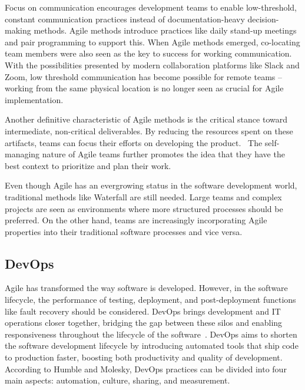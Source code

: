 Focus on communication encourages development teams to enable low-threshold, constant communication practices instead of documentation-heavy decision-making methods. Agile methods introduce practices like daily stand-up meetings and pair programming to support this. When Agile methods emerged, co-locating team members were also seen as the key to success for working communication. With the possibilities presented by modern collaboration platforms like Slack and Zoom, low threshold communication has become possible for remote teams – working from the same physical location is no longer seen as crucial for Agile implementation.

Another definitive characteristic of Agile methods is the critical stance toward intermediate, non-critical deliverables. By reducing the resources spent on these artifacts, teams can focus their efforts on developing the product.~\cite{cohen_introduction_2004} The self-managing nature of Agile teams further promotes the idea that they have the best context to prioritize and plan their work.~\cite{alshamrani_comparison_2015} 

Even though Agile has an evergrowing status in the software development world, traditional methods like Waterfall are still needed. Large teams and complex projects are seen as environments where more structured processes should be preferred. On the other hand, teams are increasingly incorporating Agile properties into their traditional software processes and vice versa.~\cite{cohen_introduction_2004} 

\subsection{DevOps}

Agile has transformed the way software is developed. However, in the software lifecycle, the performance of testing, deployment, and post-deployment functions like fault recovery should be considered. DevOps brings development and IT operations closer together, bridging the gap between these silos and enabling responsiveness throughout the lifecycle of the software~\cite{hemon-hildgen_agile_2020}. DevOps aims to shorten the software development lifecycle by introducing automated tools that ship code to production faster, boosting both productivity and quality of development\cite{cois_modern_2014}. According to Humble and Molesky, DevOps practices can be divided into four main aspects: automation, culture, sharing, and measurement\cite{humble_why_2011}. 


